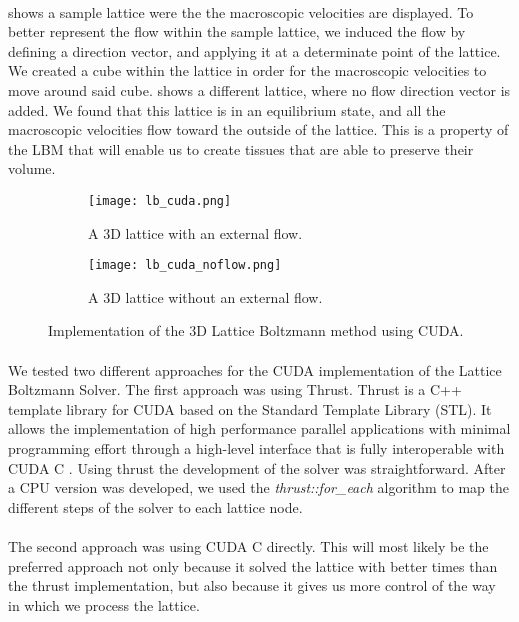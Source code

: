\paragraph{} shows a sample lattice were the the macroscopic velocities are displayed. To better represent the flow within the sample lattice, we induced the flow by defining a direction vector, and applying it at a determinate point of the lattice. We created a cube within the lattice in order for the macroscopic velocities to move around said cube.  shows a different lattice, where no flow direction vector is added. We found that this lattice is in an equilibrium state, and all the macroscopic velocities flow toward the outside of the lattice. This is a property of the LBM that will enable us to create tissues that are able to preserve their volume.

\begin{figure}[t]
    \centering
    \begin{subfigure}[h]{0.45\textwidth}
        \centering
    		\texttt{[image: lb\_cuda.png]}
    		\caption{A 3D lattice with an external flow.}
    		\label{fig:lb_cuda}
    \end{subfigure}
	\hfill
    \begin{subfigure}[h]{0.45\textwidth}
        \centering
        \texttt{[image: lb\_cuda\_noflow.png]}
        \caption{A 3D lattice without an external flow.}
        \label{fig:lb_cuda_noflow}
    \end{subfigure}

    \caption{Implementation of the 3D Lattice Boltzmann method using CUDA.}
    \label{fig:d2q9}
\end{figure}

\paragraph{}We tested two different approaches for the CUDA implementation of the Lattice Boltzmann Solver. The first approach was using Thrust. Thrust is a C++ template library for CUDA based on the Standard Template Library (STL). It allows the implementation of high performance parallel applications with minimal programming effort through a high-level interface that is fully interoperable with CUDA C \citep{nvidia2015thrust}. Using thrust the development of the solver was straightforward. After a CPU version was developed, we used the \textit{thrust::for\_each} algorithm to map the different steps of the solver to each lattice node. 


\paragraph{}The second approach was using CUDA C directly. This will most likely be the preferred approach not only because it solved the lattice with better times than the thrust implementation, but also because it gives us more control of the way in which we process the lattice.



